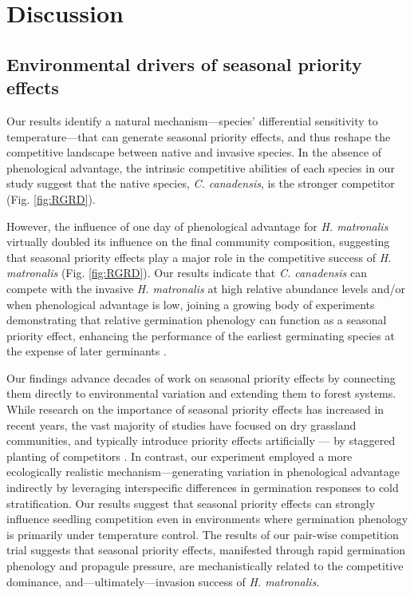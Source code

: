 \documentclass{article}[11pt]
\begin{document}
\section*{Discussion}
\subsection*{Environmental drivers of seasonal priority effects} 
Our results identify a natural mechanism---species' differential sensitivity to temperature---that can generate seasonal priority effects, and thus reshape the competitive landscape between native and invasive species. In the absence of phenological advantage, the intrinsic competitive abilities of each species in our study suggest that the native species, \textit{C. canadensis}, is the stronger competitor (Fig. \ref{fig:RGRD}). 

However, the influence of one day of phenological advantage for \textit{H. matronalis} virtually doubled its influence on the final community composition, suggesting that seasonal priority effects play a major role in the competitive success of \textit{H. matronalis} (Fig. \ref{fig:RGRD}). Our results indicate that \textit{C. canadensis} can compete with the invasive \textit{H. matronalis} at high relative abundance levels and/or when phenological advantage is low, joining a growing body of experiments demonstrating that relative germination phenology can function as a seasonal priority effect, enhancing the performance of the earliest germinating species at the expense of later germinants \citep{Korner2008,Dickson2012,Ross1972}.

Our findings advance decades of work on seasonal priority effects by connecting them directly to environmental variation and extending them to forest systems. While research on the importance of seasonal priority effects has increased in recent years, the vast majority of studies have focused on dry grassland communities, and typically introduce priority effects artificially --- by staggered planting of competitors \citep{Young:2017aa,Weidlich:2020aa}. In contrast, our experiment employed a more ecologically realistic mechanism---generating variation in phenological advantage indirectly by leveraging interspecific differences in germination responses to cold stratification. Our results suggest that seasonal priority effects can strongly influence seedling competition even in environments where germination phenology is primarily under temperature control. The results of our pair-wise competition trial suggests that seasonal priority effects, manifested through rapid germination phenology and propagule pressure, are mechanistically related to the competitive dominance, and---ultimately---invasion success of \textit{H. matronalis}. 
\end{document}
